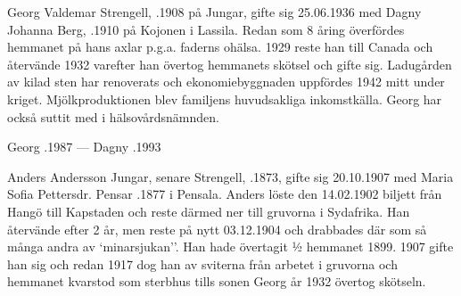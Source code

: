 %



%
Georg Valdemar Strengell, .1908 på Jungar, gifte sig 25.06.1936 med Dagny Johanna Berg, .1910 på Kojonen i Lassila. Redan som 8 åring överfördes hemmanet på hans axlar p.g.a. faderns ohälsa. 1929 reste han till Canada och återvände 1932 varefter han övertog hemmanets skötsel och gifte sig. Ladugården av kilad sten har renoverats och ekonomiebyggnaden uppfördes 1942 mitt under kriget. Mjölkproduktionen blev familjens huvudsakliga inkomstkälla. Georg har också suttit med i hälsovårdsnämnden.
\begin{jhchildren}
  \item {}
  \item {}
  \item {}
  \item {}
\end{jhchildren}

Georg .1987  ---  Dagny .1993



%
Anders Andersson Jungar, senare Strengell, .1873, gifte sig 20.10.1907 med Maria Sofia Pettersdr. Pensar .1877 i Pensala. Anders löste den 14.02.1902 biljett från Hangö till Kapstaden och reste därmed ner till gruvorna i Sydafrika. Han återvände efter 2 år, men reste på nytt 03.12.1904 och drabbades där som så många andra av `minarsjukan''. Han hade övertagit ½  hemmanet 1899. 1907 gifte han sig och redan 1917 dog han av sviterna från arbetet i gruvorna och hemmanet kvarstod som sterbhus tills sonen Georg år 1932 övertog skötseln.
\begin{jhchildren}
  \item {}
  \item {}
  \item {}
  \item {}
  \item {}
\end{jhchildren}

